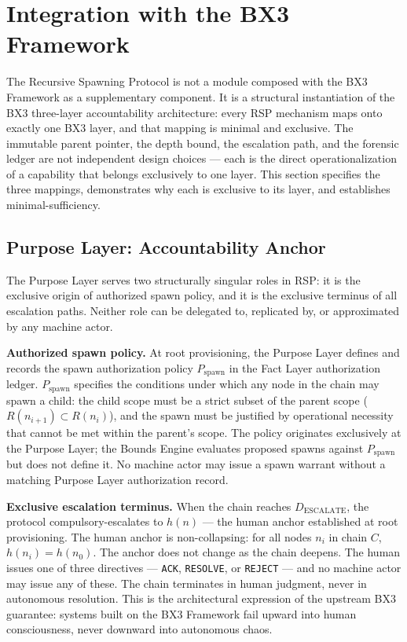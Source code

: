 \section{Integration with the BX3 Framework}
\label{sec:rs-integration}

The Recursive Spawning Protocol is not a module composed with the BX3 Framework as a supplementary component. It is a structural instantiation of the BX3 three-layer accountability architecture: every RSP mechanism maps onto exactly one BX3 layer, and that mapping is minimal and exclusive. The immutable parent pointer, the depth bound, the escalation path, and the forensic ledger are not independent design choices — each is the direct operationalization of a capability that belongs exclusively to one layer. This section specifies the three mappings, demonstrates why each is exclusive to its layer, and establishes minimal-sufficiency.

\subsection{Purpose Layer: Accountability Anchor}
\label{sec:rs-purpose-anchor}

The Purpose Layer serves two structurally singular roles in RSP: it is the exclusive origin of authorized spawn policy, and it is the exclusive terminus of all escalation paths. Neither role can be delegated to, replicated by, or approximated by any machine actor.

\medskip
\noindent\textbf{Authorized spawn policy.} At root provisioning, the Purpose Layer defines and records the spawn authorization policy $P_{\text{spawn}}$ in the Fact Layer authorization ledger. $P_{\text{spawn}}$ specifies the conditions under which any node in the chain may spawn a child: the child scope must be a strict subset of the parent scope ($R(n_{i+1}) \subset R(n_i)$), and the spawn must be justified by operational necessity that cannot be met within the parent's scope. The policy originates exclusively at the Purpose Layer; the Bounds Engine evaluates proposed spawns against $P_{\text{spawn}}$ but does not define it. No machine actor may issue a spawn warrant without a matching Purpose Layer authorization record.

\medskip
\noindent\textbf{Exclusive escalation terminus.} When the chain reaches $D_{\mathrm{ESCALATE}}$, the protocol compulsory-escalates to $h(n)$ — the human anchor established at root provisioning. The human anchor is non-collapsing: for all nodes $n_i$ in chain $C$, $h(n_i) = h(n_0)$. The anchor does not change as the chain deepens. The human issues one of three directives — \texttt{ACK}, \texttt{RESOLVE}, or \texttt{REJECT} — and no machine actor may issue any of these. The chain terminates in human judgment, never in autonomous resolution. This is the architectural expression of the upstream BX3 guarantee: systems built on the BX3 Framework fail upward into human consciousness, never downward into autonomous chaos.

